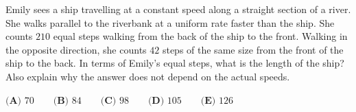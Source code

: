 Emily sees a ship travelling at a constant speed along a straight section of a river. She walks parallel to the riverbank at a uniform rate faster than the ship. She counts $210$ equal steps walking from the back of the ship to the front. Walking in the opposite direction, she counts $42$ steps of the same size from the front of the ship to the back. In terms of Emily's equal steps, what is the length of the ship? Also explain why the answer does not depend on the actual speeds.

$\textbf{(A) }70\qquad\textbf{(B) }84\qquad\textbf{(C) }98\qquad\textbf{(D) }105\qquad\textbf{(E) }126$
